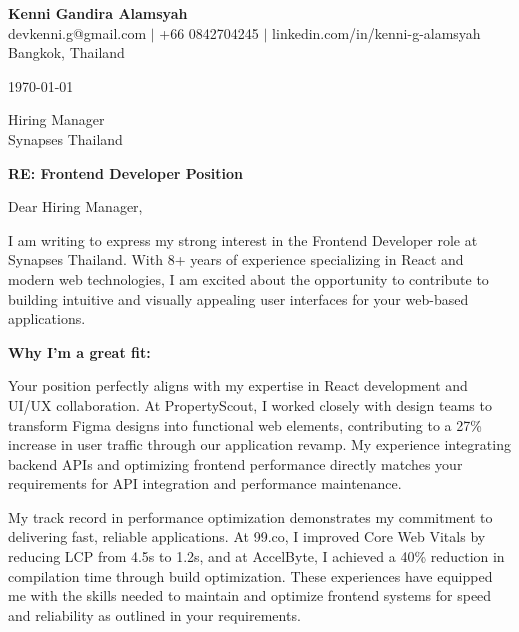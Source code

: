\documentclass[11pt]{article}
\begin{document}
\begin{center}
    {\LARGE \textbf{Kenni Gandira Alamsyah}}\\[0.3cm]
    devkenni.g@gmail.com $|$ +66 0842704245 $|$ linkedin.com/in/kenni-g-alamsyah\\[0.3cm]
    Bangkok, Thailand
\end{center}

\vspace{1cm}

\noindent
\today

\vspace{0.5cm}

\noindent
Hiring Manager\\
Synapses Thailand\\

\vspace{0.5cm}

\noindent
\textbf{RE: Frontend Developer Position}

\vspace{0.5cm}

\noindent
Dear Hiring Manager,

\vspace{0.3cm}

I am writing to express my strong interest in the Frontend Developer role at Synapses Thailand. With 8+ years of experience specializing in React and modern web technologies, I am excited about the opportunity to contribute to building intuitive and visually appealing user interfaces for your web-based applications.

\vspace{0.3cm}

\noindent
\textbf{Why I'm a great fit:}

\vspace{0.3cm}

Your position perfectly aligns with my expertise in React development and UI/UX collaboration. At PropertyScout, I worked closely with design teams to transform Figma designs into functional web elements, contributing to a 27\% increase in user traffic through our application revamp. My experience integrating backend APIs and optimizing frontend performance directly matches your requirements for API integration and performance maintenance.

\vspace{0.3cm}

My track record in performance optimization demonstrates my commitment to delivering fast, reliable applications. At 99.co, I improved Core Web Vitals by reducing LCP from 4.5s to 1.2s, and at AccelByte, I achieved a 40\% reduction in compilation time through build optimization. These experiences have equipped me with the skills needed to maintain and optimize frontend systems for speed and reliability as outlined in your requirements.
\end{document}
